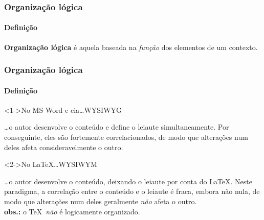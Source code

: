 \documentclass[handout]{beamer}
\begin{document}
\begin{frame}
	\frametitle{Organização lógica}
	\framesubtitle{Definição}	
	
	\centering\Huge
	\pause
	\textbf{Organização lógica} é aquela baseada na \emph{função} dos elementos de um contexto.
		
\end{frame}

\begin{frame}%
	\frametitle{Organização lógica}
	\framesubtitle{Definição}
	
	\centering
	
	\begin{block}<1->{No MS Word e cia\dots \hfill WYSIWYG}
		\begin{minipage}[c]{0.25\textwidth}
			\centering
		\end{minipage}\hfill
		\begin{minipage}[c]{0.5\textwidth}\scriptsize
				\dots o autor desenvolve o conteúdo e define o leiaute simultaneamente. Por conseguinte,
				eles são fortemente correlacionados, de modo que alterações num deles afeta
				consideravelmente o outro.
		\end{minipage}
	\end{block}
	
	\begin{block}<2->{No \LaTeX\dots \hfill WYSIWYM}
	\begin{minipage}[c]{0.25\textwidth}
	\end{minipage}\hfill
	\begin{minipage}[c]{0.5\textwidth}\scriptsize
		\dots o autor desenvolve o conteúdo, deixando o leiaute por conta do \LaTeX. Neste paradigma,
		a correlação entre o conteúdo e o leiaute é fraca, embora não nula, de modo que alterações 
		num deles geralmente \emph{não} afeta o outro.\\[\baselineskip]
		{\tiny\textbf{obs.:} o \TeX\ \emph{não} é logicamente organizado.}
	\end{minipage}
	\end{block}	
\end{frame}
\end{document}
